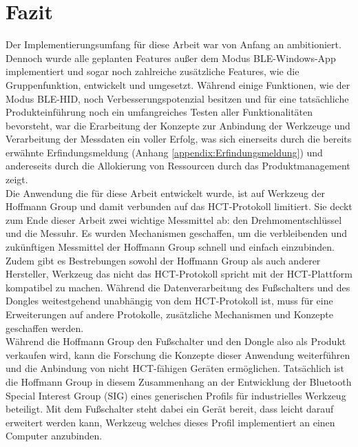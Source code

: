 \section{Fazit}
Der Implementierungsumfang für diese Arbeit war von Anfang an ambitioniert. Dennoch wurde alle geplanten Features außer dem Modus \ac{BLE}-Windows-App implementiert und sogar noch zahlreiche zusätzliche Features, wie die Gruppenfunktion, entwickelt und umgesetzt. Während einige Funktionen, wie der Modus \ac{BLE}-\ac{HID}, noch Verbesserungspotenzial besitzen und für eine tatsächliche Produkteinführung noch ein umfangreiches Testen aller Funktionalitäten bevorsteht, war die Erarbeitung der Konzepte zur Anbindung der Werkzeuge und Verarbeitung der Messdaten ein voller Erfolg, was sich einerseits durch die bereits erwähnte Erfindungsmeldung (Anhang \ref{appendix:Erfindungsmeldung}) und andereseits durch die Allokierung von Ressourcen durch das Produktmanagement zeigt.\\
Die Anwendung die für diese Arbeit entwickelt wurde, ist auf Werkzeug der Hoffmann Group und damit verbunden auf das \ac{HCT}-Protokoll limitiert. Sie deckt zum Ende dieser Arbeit zwei wichtige Messmittel ab: den Drehmomentschlüssel und die Messuhr. Es wurden Mechanismen geschaffen, um die verbleibenden und zukünftigen Messmittel der Hoffmann Group schnell und einfach einzubinden. Zudem gibt es Bestrebungen sowohl der Hoffmann Group als auch anderer Hersteller, Werkzeug das nicht das \ac{HCT}-Protokoll spricht mit der \ac{HCT}-Plattform kompatibel zu machen. Während die Datenverarbeitung des Fußschalters und des Dongles weitestgehend unabhängig von dem \ac{HCT}-Protokoll ist, muss für eine Erweiterungen auf andere Protokolle, zusätzliche Mechanismen und Konzepte geschaffen werden.\\
Während die Hoffmann Group den Fußschalter und den Dongle also als Produkt verkaufen wird, kann die Forschung die Konzepte dieser Anwendung weiterführen und die Anbindung von nicht \ac{HCT}-fähigen Geräten ermöglichen. Tatsächlich ist die Hoffmann Group in diesem Zusammenhang an der Entwicklung der Bluetooth Special Interest Group (SIG) eines generischen Profils für industrielles Werkzeug beteiligt. Mit dem Fußschalter steht dabei ein Gerät bereit, dass leicht darauf erweitert werden kann, Werkzeug welches dieses Profil implementiert an einen Computer anzubinden.

